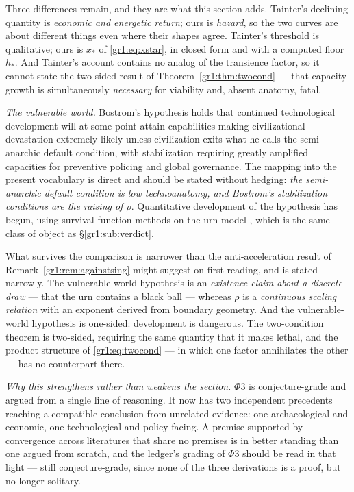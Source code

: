 \documentclass[11pt]{article}
\numberwithin{equation}{section}
\theoremstyle{plain}
\theoremstyle{definition}
\theoremstyle{remark}
\begin{document}
Three differences remain, and they are what this section adds. Tainter's
declining quantity is \emph{economic and energetic return}; ours is
\emph{hazard}, so the two curves are about different things even where
their shapes agree. Tainter's threshold is qualitative; ours is
$x_\ast$ of \eqref{gr1:eq:xstar}, in closed form and with a computed
floor $h_\ast$. And Tainter's account contains no analog of the
transience factor, so it cannot state the two-sided result of
Theorem~\ref{gr1:thm:twocond} --- that capacity growth is simultaneously
\emph{necessary} for viability and, absent anatomy, fatal.

\emph{The vulnerable world.} Bostrom's hypothesis \cite{Bostrom19} holds
that continued technological development will at some point attain
capabilities making civilizational devastation extremely likely unless
civilization exits what he calls the semi-anarchic default condition,
with stabilization requiring greatly amplified capacities for preventive
policing and global governance. The mapping into the present vocabulary
is direct and should be stated without hedging: \emph{the semi-anarchic
default condition is low technoanatomy, and Bostrom's stabilization
conditions are the raising of $\rho$}. Quantitative development of the
hypothesis has begun, using survival-function methods on the urn model
\cite{EF24}, which is the same class of object as
\S\ref{gr1:sub:verdict}.

What survives the comparison is narrower than the anti-acceleration
result of Remark~\ref{gr1:rem:againstsing} might suggest on first
reading, and is stated narrowly. The vulnerable-world hypothesis is an
\emph{existence claim about a discrete draw} --- that the urn contains a
black ball --- whereas $\rho$ is a \emph{continuous scaling relation}
with an exponent derived from boundary geometry. And the vulnerable-world
hypothesis is one-sided: development is dangerous. The two-condition
theorem is two-sided, requiring the same quantity that it makes lethal,
and the product structure of \eqref{gr1:eq:twocond} --- in which one
factor annihilates the other --- has no counterpart there.

\emph{Why this strengthens rather than weakens the section.} $\Phi3$ is
conjecture-grade and argued from a single line of reasoning. It now has
two independent precedents reaching a compatible conclusion from
unrelated evidence: one archaeological and economic, one
technological and policy-facing. A premise supported by convergence
across literatures that share no premises is in better standing than one
argued from scratch, and the ledger's grading of $\Phi3$ should be read
in that light --- still conjecture-grade, since none of the three
derivations is a proof, but no longer solitary.
\end{document}
